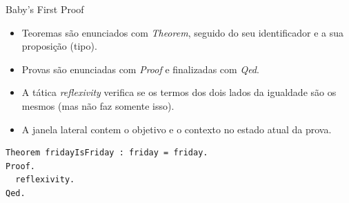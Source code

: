 \documentclass[presentation]{beamer}
\begin{document}
\begin{frame}[fragile,label={sec:org98bf8b6}]{Baby's First Proof}
 \begin{itemize}
\item Teoremas são enunciados com \emph{Theorem}, seguido do seu identificador e a sua proposição (tipo).
\item Provas são enunciadas com \emph{Proof} e finalizadas com \emph{Qed}.
\item A tática \emph{reflexivity} verifica se os termos dos dois lados da igualdade são os mesmos (mas não faz somente isso).
\item A janela lateral contem o objetivo e o contexto no estado atual da prova.
\end{itemize}
\begin{verbatim}
Theorem fridayIsFriday : friday = friday.
Proof.
  reflexivity.
Qed.
\end{verbatim}
\end{frame}
\end{document}
